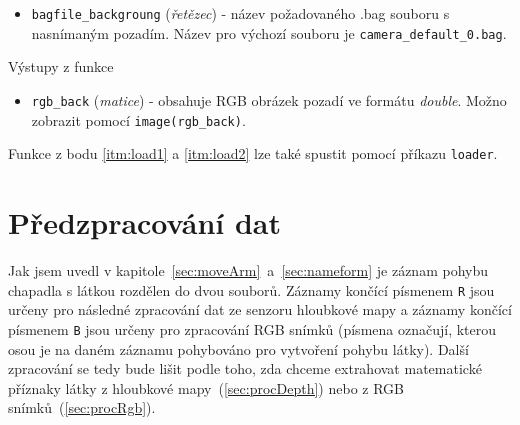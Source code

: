 \documentclass[10pt,a4paper,titlepage,oneside]{report}
\begin{document}
\begin{enumerate}
\begin{itemize}
  			\item \verb|bagfile_backgroung| (\textit{řetězec}) - název požadovaného .bag souboru s nasnímaným pozadím. Název pro výchozí souboru je \verb|camera_default_0.bag|.
    			\end{itemize}
    		Výstupy z funkce
        		\begin{itemize}
  			\item \verb|rgb_back| (\textit{matice}) - obsahuje RGB obrázek pozadí ve formátu \textit{double}. Možno zobrazit pomocí \verb|image(rgb_back)|.
    			\end{itemize}
Funkce z bodu \ref{itm:load1} a \ref{itm:load2} lze také spustit pomocí příkazu \verb|loader|.   
\end{enumerate}
%
\section{Předzpracování dat}
Jak jsem uvedl v kapitole~\ref{sec:moveArm}~a~\ref{sec:nameform} je záznam pohybu chapadla s látkou rozdělen do dvou souborů. Záznamy končící písmenem \verb|R| jsou určeny pro následné zpracování dat ze senzoru hloubkové mapy a záznamy končící písmenem \verb|B| jsou určeny pro zpracování RGB snímků (písmena označují, kterou osou je na daném záznamu pohybováno pro vytvoření pohybu látky). Další zpracování se tedy bude lišit podle toho, zda chceme extrahovat matematické příznaky látky z hloubkové mapy~(\ref{sec:procDepth}) nebo z RGB snímků~(\ref{sec:procRgb}). 
\end{document}
